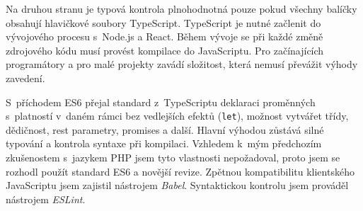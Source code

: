 Na druhou stranu je typová kontrola plnohodnotná pouze pokud všechny balíčky obsahují hlavičkové soubory TypeScript. TypeScript je nutné začlenit do vývojového procesu s~Node.js a React. Během vývoje se při každé změně zdrojového kódu musí provést kompilace do JavaScriptu. Pro začínajících programátory a pro malé projekty zavádí složitost, která nemusí převážit výhody zavedení.

S~příchodem ES6 přejal standard z~TypeScriptu deklaraci proměnných s~platností v~daném rámci bez vedlejších efektů (\texttt{let}), možnost vytvářet třídy, dědičnost, rest parametry, promises a další. Hlavní výhodou zůstává silné typování a kontrola syntaxe při kompilaci. Vzhledem k~mým předchozím zkušenostem s~jazykem PHP jsem tyto vlastnosti nepožadoval, proto jsem se rozhodl použít standard ES6 a novější revize. Zpětnou kompatibilitu klientského JavaScriptu jsem zajistil nástrojem \textit{Babel}. Syntaktickou kontrolu jsem prováděl nástrojem \textit{ESLint}.

